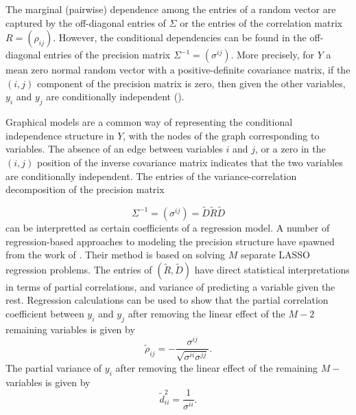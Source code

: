 \documentclass[../chapter-1-introduction.tex]{subfiles}
\begin{document}
The marginal (pairwise) dependence among the entries of a random vector are captured by the off-diagonal entries of $\Sigma$ or the entries of the correlation matrix $R = \left(\rho_{ij}\right)$. However, the conditional dependencies can be found in the off-diagonal entries of the precision matrix $\Sigma^{-1} = \left( \sigma^{ij} \right)$. More precisely, for $Y$ a mean zero normal random vector with a positive-definite covariance matrix, if the $\left(i,j\right)$ component of the precision matrix is zero, then given the other variables, $y_i$ and $y_j$ are conditionally independent (\citet{Anderson84a}). 

\bigskip

Graphical models are a common way of representing the conditional independence structure in $Y$, with the nodes of the graph corresponding to variables. The absence of an edge between variables $i$ and $j$, or a zero in the $\left(i,j\right)$ position of the inverse covariance matrix indicates that the two variables are conditionally independent. The entries of the variance-correlation decomposition of the precision matrix 

\begin{equation} \label{eq:inverse-covariance-decomposition}
\Sigma^{-1} = \left( \sigma^{ij}\right) = \tilde{D} \tilde{R} \tilde{D} 
\end{equation}
\noindent
can be interpretted as certain coefficients of a regression model. A number of regression-based approaches to modeling the precision structure have spawned from the work of \citet{Meinshausen2006highDimGraphs}. Their method is based on solving $M$ separate LASSO regression problems. The entries of $\left(\tilde{R}, \tilde{D}\right)$ have direct statistical interpretations in terms of partial correlations, and variance of predicting a variable given the rest. Regression calculations can be used to show that the partial correlation coefficient between $y_i$ and $y_j$ after removing the linear effect of the $M - 2$ remaining variables is given by 
\begin{equation} \label{eq:partial-correlation}
\tilde{\rho}_{ij}= -\frac{\sigma^{ij}}{\sqrt{\sigma^{ii}\sigma^{jj}}}.
\end{equation}
\noindent
The partial variance of $y_i$ after removing the linear effect of the remaining $M-$ variables is given by 
\begin{equation} \label{eq:partial-variance}
\tilde{d}^2_{ii}= \frac{1}{\sigma^{ii}}.
\end{equation}
\end{document}
